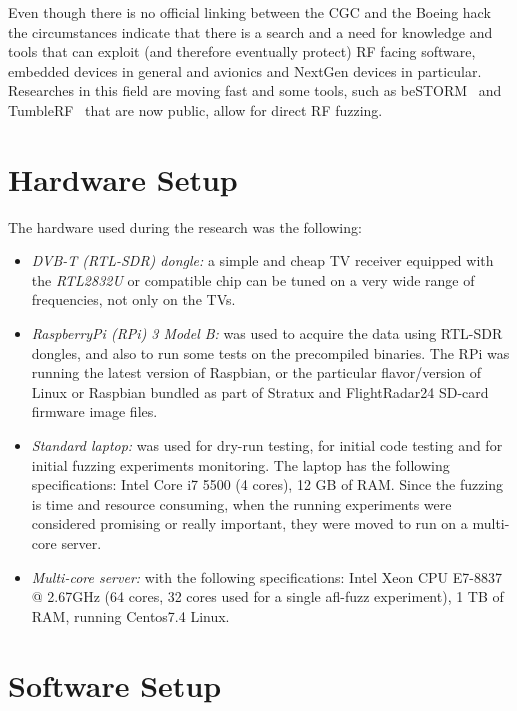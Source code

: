 \documentclass[../main.tex]{subfiles}
\begin{document}
Even though there is no official linking between the CGC and the Boeing hack the
circumstances indicate that there is a search and a need for knowledge and tools
that can exploit (and therefore eventually protect) RF facing software, embedded
devices in general and avionics and NextGen devices in particular. Researches in
this field are moving fast and some tools, such as beSTORM~\cite{bestorm} and
TumbleRF~\cite{tumblerf} that are now public, allow for direct RF fuzzing.

\section{Hardware Setup}

The hardware used during the research was the following:
\begin{itemize}

\item \textit{DVB-T (RTL-SDR) dongle:} a simple and cheap TV receiver equipped with the \emph{RTL2832U} or compatible chip can be tuned on a very wide range of frequencies, not only on the TVs.

\item \textit{RaspberryPi (RPi) 3 Model B:} was used to acquire the data using RTL-SDR dongles, and also to run some tests on the precompiled binaries. The RPi was running the latest version of Raspbian, or the particular flavor/version of Linux or Raspbian bundled as part of Stratux and FlightRadar24 SD-card firmware image files.

\item \textit{Standard laptop:} was used for dry-run testing, for initial code testing and for initial fuzzing experiments monitoring. The laptop has the following specifications: Intel Core i7 5500 (4 cores), 12 GB of RAM. Since the fuzzing is time and resource consuming, when the running experiments were considered promising or really important, they were moved to run on a multi-core server.

\item \textit{Multi-core server:} with the following specifications: Intel Xeon CPU E7-8837 @ 2.67GHz (64 cores, 32 cores used for a single afl-fuzz experiment), 1 TB of RAM, running Centos7.4 Linux.
\end{itemize}

\section{Software Setup}
\end{document}
